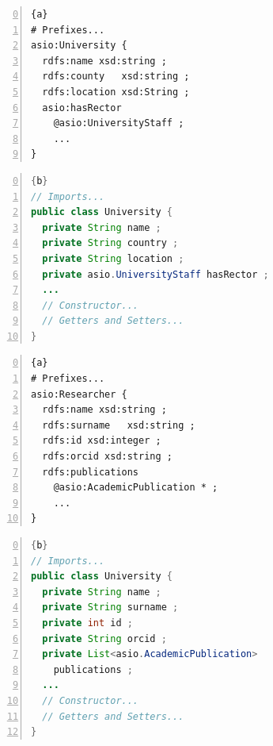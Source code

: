 \begin{center}
	\noindent\begin{minipage}[t]{.4\textwidth}
		\begin{lstlisting}[frame=topline,numbers=left,firstnumber=0,title=\scriptsize\texttt{University.shexl}, basicstyle=\ttfamily\scriptsize]{a}
# Prefixes...
asio:University {
  rdfs:name xsd:string ;
  rdfs:county   xsd:string ;
  rdfs:location xsd:String ;
  asio:hasRector
    @asio:UniversityStaff ;
	...
}
		\end{lstlisting}
	\end{minipage}\hfill
	\begin{minipage}[t]{.5\textwidth}
		\begin{lstlisting}[language=Java, frame=t,numbers=left,firstnumber=0,title=\scriptsize\texttt{University.java}, basicstyle=\ttfamily\scriptsize]{b}
// Imports...
public class University {
  private String name ;
  private String country ;
  private String location ;
  private asio.UniversityStaff hasRector ;
  ...
  // Constructor...
  // Getters and Setters...
}
		\end{lstlisting}
	\end{minipage}
	\label{fig:example-2}
\end{center}

\begin{center}
	\noindent\begin{minipage}[t]{.4\textwidth}
		\begin{lstlisting}[frame=topline,numbers=left,firstnumber=0,title=\scriptsize\texttt{Researcher.shexl}, basicstyle=\ttfamily\scriptsize]{a}
# Prefixes...
asio:Researcher {
  rdfs:name xsd:string ;
  rdfs:surname   xsd:string ;
  rdfs:id xsd:integer ;
  rdfs:orcid xsd:string ;
  rdfs:publications
    @asio:AcademicPublication * ;
	...
}
		\end{lstlisting}
	\end{minipage}\hfill
	\begin{minipage}[t]{.5\textwidth}
		\begin{lstlisting}[language=Java, frame=t,firstnumber=0,numbers=left,title=\scriptsize\texttt{Researcher.java}, basicstyle=\ttfamily\scriptsize]{b}
// Imports...
public class University {
  private String name ;
  private String surname ;
  private int id ;
  private String orcid ;
  private List<asio.AcademicPublication>
    publications ;
  ...
  // Constructor...
  // Getters and Setters...
}
		\end{lstlisting}
	\end{minipage}
	\label{fig:example-3}
\end{center}


